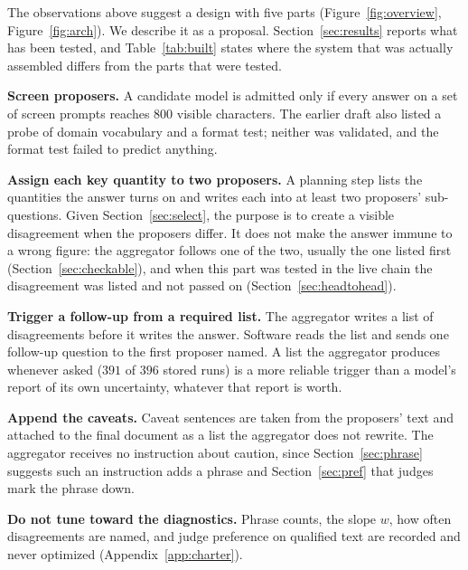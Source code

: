 \documentclass[10pt,twocolumn]{article}
\begin{document}
The observations above suggest a design with five parts
(Figure~\ref{fig:overview}, Figure~\ref{fig:arch}). We describe it as a
proposal. Section~\ref{sec:results} reports what has been tested, and
Table~\ref{tab:built} states where the system that was actually
assembled differs from the parts that were tested.

\textbf{Screen proposers.} A candidate model is admitted only if every
answer on a set of screen prompts reaches 800 visible characters. The
earlier draft also listed a probe of domain vocabulary and a format
test; neither was validated, and the format test failed to predict
anything.

\textbf{Assign each key quantity to two proposers.} A planning step
lists the quantities the answer turns on and writes each into at least
two proposers' sub-questions. Given Section~\ref{sec:select}, the
purpose is to create a visible disagreement when the proposers differ.
It does not make the answer immune to a wrong figure: the aggregator
follows one of the two, usually the one listed first
(Section~\ref{sec:checkable}), and when this part was tested in the
live chain the disagreement was listed and not passed on
(Section~\ref{sec:headtohead}).

\textbf{Trigger a follow-up from a required list.} The aggregator
writes a list of disagreements before it writes the answer. Software
reads the list and sends one follow-up question to the first proposer
named. A list the aggregator produces whenever asked ($391$ of $396$
stored runs) is a more reliable trigger than a model's report of its
own uncertainty, whatever that report is worth.

\textbf{Append the caveats.} Caveat sentences are taken from the
proposers' text and attached to the final document as a list the
aggregator does not rewrite. The aggregator receives no instruction
about caution, since Section~\ref{sec:phrase} suggests such an
instruction adds a phrase and Section~\ref{sec:pref} that judges mark
the phrase down.

\textbf{Do not tune toward the diagnostics.} Phrase counts, the slope
$w$, how often disagreements are named, and judge preference on
qualified text are recorded and never optimized
(Appendix~\ref{app:charter}).
\end{document}
